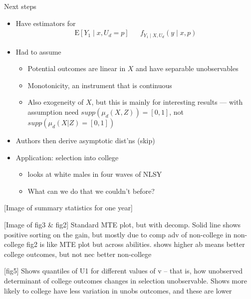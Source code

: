 \documentclass{beamer}
\begin{document}
\begin{frame}{Next steps}
  \begin{itemize}
  \item Have estimators for
    \begin{eqnarray*}
  \mathrm{E}[Y_1\mid x,U_d=p] &   & f_{Y_1\mid X,U_d}(y\mid x,p)
    \end{eqnarray*}
    \item Had to assume
    \begin{itemize}
    \item Potential outcomes are linear in $X$ and have separable unobservables
    \item Monotonicity, an instrument that is continuous
      \item Also exogeneity of $X$, but this is mainly for interesting results --- with assumption need $supp(\mu_d(X,Z))=[0,1]$, not $supp(\mu_d(X|Z)=[0,1])$
    \end{itemize}
  \item Authors then derive asymptotic dist'ns (skip)
  \item Application: selection into college
    \begin{itemize}
      \item looks at white males in four waves of NLSY
      \item What can we do that we couldn't before?
    \end{itemize}
  \end{itemize}  
\end{frame}


\begin{frame}{}{}
  [Image of summary statistics for one year]
\end{frame}

\begin{frame}{}{}
  [Image of fig3 \& fig2]
  Standard MTE plot, but with decomp. Solid line shows positive sorting on the gain, but mostly due to comp adv of non-college in non-college
  fig2 is like MTE plot but across abilities. shows higher ab means better college outcomes, but not nec better non-college
\end{frame}


\begin{frame}{}{}
  [fig5]
  Shows quantiles of U1 for different values of v -- that is, how unobserved determinant of college outcomes changes in selection unobservable. Shows more likely to college have less variation in unobs outcomes, and these are lower
\end{frame}
\end{document}

